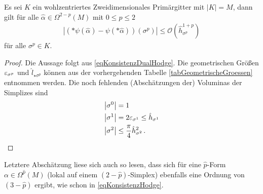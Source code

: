   \begin{satz}
    Es sei \( K \) ein wohlzentriertes Zweidimensionales Primärgitter mit \( |K| = M \),
    dann gilt für alle \( \hat\alpha\in\Omega^{2-p}(M) \) mit \( 0 \le p \le 2\)
    \begin{align}
      \left| \left( *\psi(\hat\alpha) - \psi(*\hat\alpha) \right)(\sigma^{p})\right| \le \mathcal{O}\left(\hat{h}_{\sigma^{p}}^{1+p}\right)
    \end{align}
    für alle \( \sigma^{p}\in K \).
  \end{satz}
  \begin{proof}
    Die Aussage folgt aus \eqref{eqKonsistenzDualHodge}. 
    Die geometrischen Größen \( \varepsilon_{\sigma^{p}} \) und \( \hat{l}_{\star\sigma^{p}} \) können aus der vorhergehenden Tabelle \eqref{tabGeometrischeGroessen} entnommen werden.
    Die noch fehlenden (Abschätzungen der) Voluminas der Simplizes sind
    \begin{align}
    \begin{aligned}
       \left| \sigma^{0} \right| &= 1 \\
       \left| \sigma^{1} \right| &= 2\varepsilon_{\sigma^{1}} \le \hat{h}_{\sigma^{1}} \\
       \left| \sigma^{2} \right| &\le \frac{\pi}{4} \hat{h}_{\sigma^{2}}^{2} \,\text{.}
    \end{aligned}
    \end{align}
  \end{proof}
  Letztere Abschätzung liese sich auch so lesen, dass sich für eine \( \hat{p} \)-Form \( \alpha\in\Omega^{\hat{p}}(M) \) 
  (lokal auf einem \( (2-\hat{p}) \)-Simplex) ebenfalls eine Ordnung von \( (3-\hat{p}) \) ergibt, wie schon in \eqref{eqKonsistenzHodge}.

